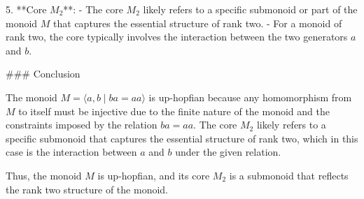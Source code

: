 5. **Core \( M_2 \)**:
   - The core \( M_2 \) likely refers to a specific submonoid or part of the monoid \( M \) that captures the essential structure of rank two.
   - For a monoid of rank two, the core typically involves the interaction between the two generators \( a \) and \( b \).

### Conclusion

The monoid \( M = \langle a, b \mid ba = aa \rangle \) is up-hopfian because any homomorphism from \( M \) to itself must be injective due to the finite nature of the monoid and the constraints imposed by the relation \( ba = aa \). The core \( M_2 \) likely refers to a specific submonoid that captures the essential structure of rank two, which in this case is the interaction between \( a \) and \( b \) under the given relation.

Thus, the monoid \( M \) is up-hopfian, and its core \( M_2 \) is a submonoid that reflects the rank two structure of the monoid.